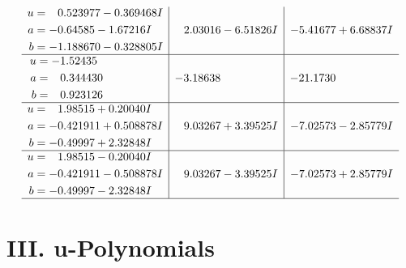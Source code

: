 \documentclass[1p]{elsarticle_modified}
\theoremstyle{definition}
\begin{document}
$$\begin{array}{c|c|c}
\begin{aligned}
u &= \phantom{-}0.523977 - 0.369468 I \\
a &= -0.64585 - 1.67216 I \\
b &= -1.188670 - 0.328805 I\end{aligned}
 & \phantom{-}2.03016 - 6.51826 I & -5.41677 + 6.68837 I \\ \hline\begin{aligned}
u &= -1.52435\phantom{ +0.000000I} \\
a &= \phantom{-}0.344430\phantom{ +0.000000I} \\
b &= \phantom{-}0.923126\phantom{ +0.000000I}\end{aligned}
 & -3.18638\phantom{ +0.000000I} & -21.1730\phantom{ +0.000000I} \\ \hline\begin{aligned}
u &= \phantom{-}1.98515 + 0.20040 I \\
a &= -0.421911 + 0.508878 I \\
b &= -0.49997 + 2.32848 I\end{aligned}
 & \phantom{-}9.03267 + 3.39525 I & -7.02573 - 2.85779 I \\ \hline\begin{aligned}
u &= \phantom{-}1.98515 - 0.20040 I \\
a &= -0.421911 - 0.508878 I \\
b &= -0.49997 - 2.32848 I\end{aligned}
 & \phantom{-}9.03267 - 3.39525 I & -7.02573 + 2.85779 I\\
 \hline 
 \end{array}$$\newpage
\newpage\renewcommand{\arraystretch}{1}
\centering \section*{ III. u-Polynomials}
\end{document}
